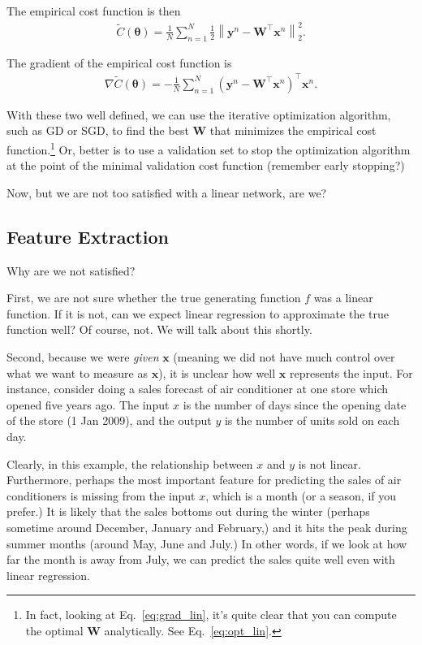 \documentclass{report}
\newcommand{\vect}[1]{\mathbf{#1}}
\newcommand{\vects}[1]{\boldsymbol{#1}}
\newcommand{\matr}[1]{\mathbf{#1}}
\newcommand{\vx}[0]{\vect{x}}
\newcommand{\vy}[0]{\vect{y}}
\newcommand{\mW}[0]{\matr{W}}
\newcommand{\TT}[0]{\vects{\theta}}
\begin{document}
The empirical cost function is then
\begin{align*}
    \tilde{C}(\TT) = \frac{1}{N} \sum_{n=1}^N \frac{1}{2} \left\| \vy^n - \mW^\top \vx^n
    \right\|^2_2.
\end{align*}

The gradient of the empirical cost function is
\begin{align}
    \label{eq:grad_lin}
    \nabla \tilde{C}(\TT) = -\frac{1}{N} \sum_{n=1}^N 
    \left( \vy^n - \mW^\top \vx^n\right)^\top \vx^n.
\end{align}

With these two well defined, we can use the iterative optimization algorithm,
such as GD or SGD, to find the best $\mW$ that minimizes the empirical cost
function.\footnote{
    In fact, looking at Eq.~\eqref{eq:grad_lin}, it's quite clear that you can
    compute the optimal $\mW$ analytically. See Eq.~\eqref{eq:opt_lin}.
}
Or, better is to use a validation set to stop the optimization
algorithm at the point of the minimal validation cost function (remember early
stopping?)

Now, but we are not too satisfied with a linear network, are we?

\subsection{Feature Extraction}
\label{sec:feature_extraction}

Why are we not satisfied?

First, we are not sure whether the true generating function $f$ was a linear
function. If it is not, can we expect linear regression to approximate the true
function well? Of course, not. We will talk about this shortly.

Second, because we were {\em given} $\vx$ (meaning we did not have much control
over what we want to measure as $\vx$), it is unclear how well $\vx$ represents
the input. For instance, consider doing a sales forecast of air conditioner at
one store which opened five years ago. The input $x$ is the number of days since
the opening date of the store (1 Jan 2009), and the output $y$ is the number of
units sold on each day.

Clearly, in this example, the relationship between $x$ and $y$ is not linear.
Furthermore, perhaps the most important feature for predicting the sales of air
conditioners is missing from the input $x$, which is a month (or a season, if
you prefer.) It is likely that the sales bottoms out during the winter (perhaps
sometime around December, January and February,) and it hits the peak during
summer months (around May, June and July.) In other words, if we look at how far
the month is away from July, we can predict the sales quite well even with 
linear regression.
\end{document}
